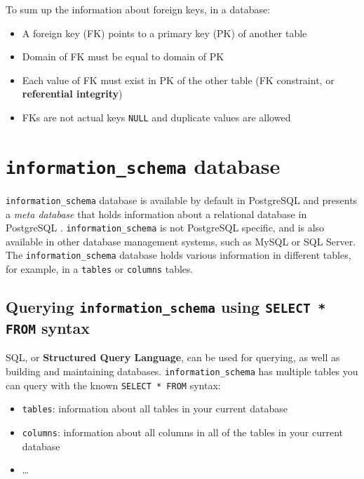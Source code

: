 \documentclass[11pt]{article}
\begin{document}
    To sum up the information about foreign keys, in a database:

    \begin{itemize}
        \item A foreign key (FK) points to a primary key (PK) of another table
        \item Domain of FK must be equal to domain of PK
        \item Each value of FK must exist in PK of the other table (FK constraint, or \textbf{referential integrity})
        \item FKs are not actual keys \textemdash \texttt{NULL} and duplicate values are allowed
    \end{itemize}

    \section{\texttt{information\_schema} database} \label{sec:info_schema}

    \texttt{information\_schema} database is available by default in PostgreSQL and presents a \textit{meta database} that holds information about a relational database in PostgreSQL .
    \texttt{information\_schema} is not PostgreSQL specific, and is also available in other database management systems, such as MySQL or SQL Server.
    The \texttt{information\_schema} database holds various information in different tables, for example, in a \texttt{tables} or \texttt{columns} tables.

    \subsection{Querying \texttt{information\_schema} using \texttt{SELECT * FROM} syntax} \label{subsec:info_schema_q}

    SQL, or \textbf{Structured Query Language}, can be used for querying, as well as building and maintaining databases.
    \texttt{information\_schema} has multiple tables you can query with the known \texttt{SELECT * FROM} syntax:

    \begin{itemize}
        \item \texttt{tables}: information about all tables in your current database
        \item \texttt{columns}: information about all columns in all of the tables in your current database
        \item \ldots
    \end{itemize}
\end{document}
